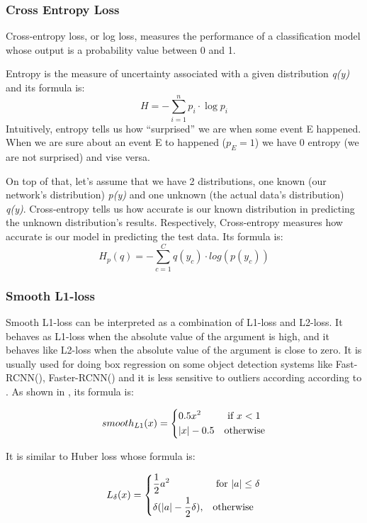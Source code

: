 \subsubsection{Cross Entropy Loss}
Cross-entropy loss, or log loss, measures the performance of a classification model whose output is a probability value between 0 and 1. \par
Entropy is the measure of uncertainty associated with a given distribution \textit{q(y)} and its formula is: 
\[ H = -\sum_{i=1}^n p_i \cdot \log p_i \]
Intuitively, entropy tells us how ``surprised'' we are when some event E happened. When we are sure about an event E to happened ($ p_E = 1$)
we have 0 entropy (we are not surprised) and vise versa. \par
On top of that, let's assume that we have 2 distributions, one known (our network's distribution) \textit{p(y)} and one unknown (the actual
data's distribution) \textit{q(y)}. Cross-entropy tells us how accurate is our known distribution in predicting the unknown distribution's
results. Respectively, Cross-entropy measures how accurate is our model in predicting the test data. Its formula is:
\[ H_p(q) = - \sum_{c=1}^C q(y_c) \cdot log(p(y_c)) \]

\subsubsection{Smooth L1-loss}

Smooth L1-loss can be interpreted as a combination of L1-loss and L2-loss. It behaves as L1-loss when the absolute
value of the argument is high, and it behaves like L2-loss when the absolute value of the argument is close to zero.
It is usually used for doing box regression on some object detection systems like Fast-RCNN(\cite{Girshick:2015:FR:2919332.2920125}),
Faster-RCNN(\cite{Ren:2015:FRT:2969239.2969250}) and it is less sensitive to outliers according according to \cite{Girshick:2015:FR:2919332.2920125}.
As shown in \cite{Girshick:2015:FR:2919332.2920125}, its formula is:

\[ smooth_{L1}(x) = \begin{dcases}
    0.5x^2 & \text{ if } x < 1 \\
    |x| - 0.5 & \text{otherwise}
  \end{dcases}\]

It is similar to Huber loss whose formula is:

\[
L_{\delta}(x) = \begin{dcases}
    \frac{1}{2}a^2 & \text{ for } |a| \le \delta \\
\delta(|a| - \frac{1}{2}\delta), & \text{otherwise}
\end{dcases}
\]


